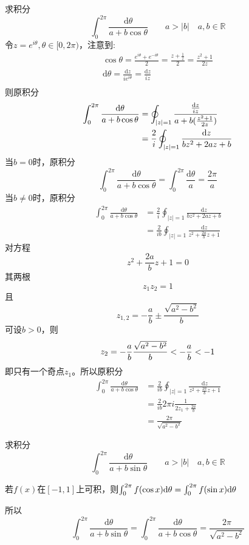 \begin{homeworkProblem}
    求积分
    \[
    \int_0^{2\pi}\frac{\mathrm{d}\theta}{a+b\cos\theta} \qquad a>|b|\quad a,b\in\mathbb{R}
    \]
\solution
令$z=e^{i\theta}, \theta\in[0, 2\pi)$，注意到:
\begin{gather*}
\cos\theta = \frac{e^{i\theta}+e^{-i\theta}}{2}=\frac{z+\frac{1}{z}}{2}=\frac{z^2+1}{2z}\\
\mathrm{d}\theta = \frac{\mathrm{d}z}{ie^{i\theta}}=\frac{\mathrm{d}z}{iz}\\
\end{gather*}
则原积分
\[\begin{split}
\int_0^{2\pi}\frac{\mathrm{d}\theta}{a+b\cos\theta}
&= \oint_{|z|=1}\cfrac{\frac{\mathrm{d}z}{iz}}{a+b(\frac{z^2+1}{2z})}\\
&=\frac{2}{i}\oint_{|z|=1}\frac{\mathrm{d}z}{bz^2+2az+b}
\end{split}\]
当$b=0$时，原积分
\[\int_0^{2\pi}\frac{\mathrm{d}\theta}{a+b\cos\theta}
=\int_0^{2\pi}\frac{\mathrm{d}\theta}{a}
=\frac{2\pi}{a}\]
当$b\neq0$时，原积分
\[\begin{split}\int_0^{2\pi}\frac{\mathrm{d}\theta}{a+b\cos\theta}
&=\frac{2}{i}\oint_{|z|=1}\frac{\mathrm{d}z}{bz^2+2az+b}\\
&=\frac{2}{ib}\oint_{|z|=1}\frac{\mathrm{d}z}{z^2+\frac{2a}{b}z+1}
\end{split}\]
对方程\[z^2+\frac{2a}{b}z+1=0\]其两根\[z_1z_2=1\]且
\[z_{1,2}=-\frac{a}{b}\pm\frac{\sqrt{a^2-b^2}}{b}\]
可设$b>0$，则
\[z_2 =-\frac{a}{b}\-\frac{\sqrt{a^2-b^2}}{b}<-\frac{a}{b}<-1\]
即只有一个奇点$z_1$。所以原积分
\[\begin{split}
\int_0^{2\pi}\frac{\mathrm{d}\theta}{a+b\cos\theta}
&=\frac{2}{ib}\oint_{|z|=1}\frac{\mathrm{d}z}{z^2+\frac{2a}{b}z+1}\\
&=\frac{2}{ib}2\pi i\frac{1}{2z_1+\frac{2a}{b}}\\
&=\frac{2\pi}{\sqrt{a^2-b^2}}
\end{split}\]
\end{homeworkProblem}
\begin{homeworkProblem}
    求积分
    \[
    \int_0^{2\pi}\frac{\mathrm{d}\theta}{a+b\sin\theta} \qquad a>|b|\quad a,b\in\mathbb{R}
    \]
\solution
\begin{theorem*}
    若$f(x)$在$[-1,1]$上可积，则$\int_0^{2\pi}f(\cos x)\mathrm{d}\theta=\int_0^{2\pi}f(\sin x)\mathrm{d}\theta$
\end{theorem*}
所以
\[\int_0^{2\pi}\frac{\mathrm{d}\theta}{a+b\sin\theta}=\int_0^{2\pi}\frac{\mathrm{d}\theta}{a+b\cos\theta}=\frac{2\pi}{\sqrt{a^2-b^2}}\]
\end{homeworkProblem}
